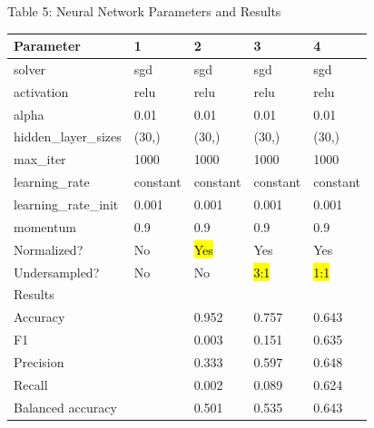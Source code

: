 \documentclass{article}
\begin{document}
\begin{table}

	\centering
	Table 5: Neural Network Parameters and Results\\
	\begin{tabular}{ l l l l l }
		\hline
		Parameter & 1 & 2 & 3 & 4\\
		\hline
		solver & sgd & sgd & sgd & sgd\\
		activation & relu & relu & relu & relu\\
		alpha & 0.01 & 0.01 & 0.01 & 0.01\\
		hidden\_layer\_sizes & (30,) & (30,) & (30,) & (30,)\\
		max\_iter & 1000 & 1000 & 1000 & 1000\\
		learning\_rate & constant & constant & constant & constant \\
		learning\_rate\_init & 0.001 & 0.001 & 0.001 & 0.001 \\
		momentum & 0.9 & 0.9 & 0.9 & 0.9 \\
		Normalized? & No & \hl{Yes} & Yes & Yes\\
		Undersampled? & No & No & \hl{3:1} & \hl{1:1}\\
		\hline
		Results & & & & \\
		\hline
		Accuracy & & 0.952 & 0.757 & 0.643 \\
		F1 &  & 0.003 & 0.151 & 0.635 \\
		Precision & & 0.333 & 0.597 & 0.648  \\
		Recall & & 0.002 & 0.089 & 0.624 \\
		Balanced accuracy & & 0.501 & 0.535 & 0.643 \\
	
		\hline 
	\end{tabular}
\end{table}
\end{document}
